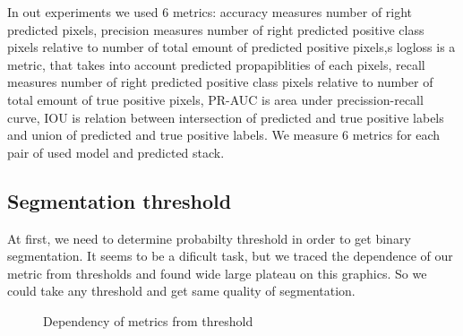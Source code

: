 \documentclass[review]{elsarticle}
\begin{document}
In out experiments we used 6 metrics:
accuracy measures number of right predicted pixels,
precision measures number of right predicted positive class pixels relative to number of total emount of predicted positive pixels,s
logloss is a metric, that takes into account predicted propapiblities of each pixels, recall measures number of right predicted positive class pixels relative to number of total emount 
of true positive pixels, PR-AUC is area under precission-recall curve, IOU is relation between intersection of predicted and true positive labels and union of predicted and true positive labels.
We measure 6 metrics for each pair of used model and predicted stack. 

\subsection{Segmentation threshold}

At first, we need to determine probabilty threshold in order to get binary segmentation. It seems to be a dificult task, but we traced the dependence of our metric from thresholds and found wide large plateau on this graphics. So we could take any threshold and get same quality of segmentation.

\begin{figure}[h]
	\caption{Dependency of metrics from threshold}
	\label{Results:threshold_precision}
\end{figure}
\end{document}
